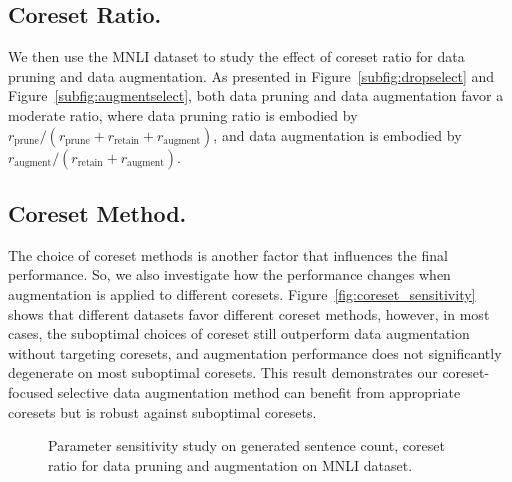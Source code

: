 \subsection{Coreset Ratio.} 
We then use the MNLI dataset to study the effect of coreset ratio for data pruning and data augmentation. 
As presented in Figure~\ref{subfig:dropselect} and Figure~\ref{subfig:augmentselect}, both data pruning and data augmentation favor a moderate ratio, where data pruning ratio is embodied by \(r_\text{prune} / (r_\text{prune} + r_\text{retain} + r_\text{augment})\), and data augmentation is embodied by \(r_\text{augment} / (r_\text{retain} + r_\text{augment})\).




\subsection{Coreset Method.}
The choice of coreset methods is another factor that influences the final performance. 
So, we also investigate how the performance changes when augmentation is applied to different coresets. Figure~\ref{fig:coreset_sensitivity} shows that different datasets favor different coreset methods, however, in most cases, the suboptimal choices of coreset still outperform data augmentation without targeting coresets, and augmentation performance does not significantly degenerate on most suboptimal coresets. This result demonstrates our coreset-focused selective data augmentation method can benefit from appropriate coresets but is robust against suboptimal coresets. 


\begin{figure*}[htbp!]
    \centering
    \vspace{-5mm}
    \caption{Parameter sensitivity study on generated sentence count, coreset ratio for data pruning and augmentation on MNLI dataset.}
    \label{fig:sensitivity}
\end{figure*}


